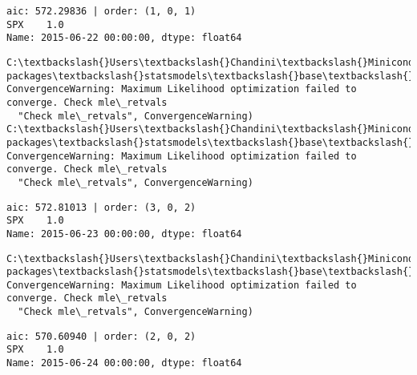 \documentclass[11pt]{article}
\begin{document}
    \begin{Verbatim}[commandchars=\\\{\}]
aic: 572.29836 | order: (1, 0, 1)
SPX    1.0
Name: 2015-06-22 00:00:00, dtype: float64

    \end{Verbatim}

    \begin{Verbatim}[commandchars=\\\{\}]
C:\textbackslash{}Users\textbackslash{}Chandini\textbackslash{}Miniconda3\textbackslash{}envs\textbackslash{}auquan\textbackslash{}lib\textbackslash{}site-packages\textbackslash{}statsmodels\textbackslash{}base\textbackslash{}model.py:496: ConvergenceWarning: Maximum Likelihood optimization failed to converge. Check mle\_retvals
  "Check mle\_retvals", ConvergenceWarning)
C:\textbackslash{}Users\textbackslash{}Chandini\textbackslash{}Miniconda3\textbackslash{}envs\textbackslash{}auquan\textbackslash{}lib\textbackslash{}site-packages\textbackslash{}statsmodels\textbackslash{}base\textbackslash{}model.py:496: ConvergenceWarning: Maximum Likelihood optimization failed to converge. Check mle\_retvals
  "Check mle\_retvals", ConvergenceWarning)

    \end{Verbatim}

    \begin{Verbatim}[commandchars=\\\{\}]
aic: 572.81013 | order: (3, 0, 2)
SPX    1.0
Name: 2015-06-23 00:00:00, dtype: float64

    \end{Verbatim}

    \begin{Verbatim}[commandchars=\\\{\}]
C:\textbackslash{}Users\textbackslash{}Chandini\textbackslash{}Miniconda3\textbackslash{}envs\textbackslash{}auquan\textbackslash{}lib\textbackslash{}site-packages\textbackslash{}statsmodels\textbackslash{}base\textbackslash{}model.py:496: ConvergenceWarning: Maximum Likelihood optimization failed to converge. Check mle\_retvals
  "Check mle\_retvals", ConvergenceWarning)

    \end{Verbatim}

    \begin{Verbatim}[commandchars=\\\{\}]
aic: 570.60940 | order: (2, 0, 2)
SPX    1.0
Name: 2015-06-24 00:00:00, dtype: float64

    \end{Verbatim}
\end{document}
